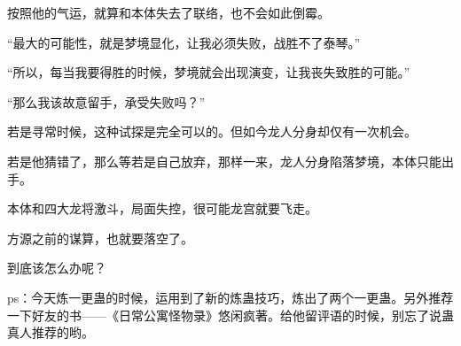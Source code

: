 \begin{this_body}
按照他的气运，就算和本体失去了联络，也不会如此倒霉。

“最大的可能性，就是梦境显化，让我必须失败，战胜不了泰琴。”

“所以，每当我要得胜的时候，梦境就会出现演变，让我丧失致胜的可能。”

“那么我该故意留手，承受失败吗？”

若是寻常时候，这种试探是完全可以的。但如今龙人分身却仅有一次机会。

若是他猜错了，那么等若是自己放弃，那样一来，龙人分身陷落梦境，本体只能出手。

本体和四大龙将激斗，局面失控，很可能龙宫就要飞走。

方源之前的谋算，也就要落空了。

到底该怎么办呢？

ps：今天炼一更蛊的时候，运用到了新的炼蛊技巧，炼出了两个一更蛊。另外推荐一下好友的书——《日常公寓怪物录》悠闲疯著。给他留评语的时候，别忘了说蛊真人推荐的哟。

\end{this_body}

